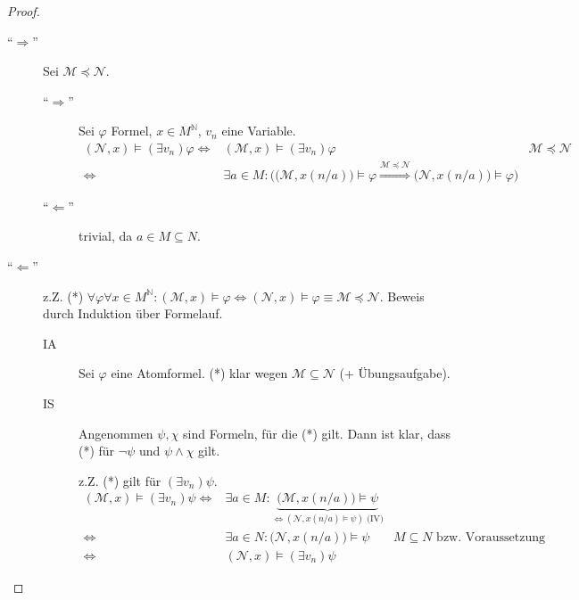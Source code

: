 \documentclass{article}
\theoremstyle{definition}
\theoremstyle{plain}
\newcommand{\m}[1]{\mathcal{#1}}
\begin{document}
    \begin{proof}
        ~\par
        \begin{description}
            \item[``$ \Rightarrow $''] Sei $ \m{M} \preceq \m{N} $.
            \begin{description}
                \item[``$ \Rightarrow $'']
                Sei $ \varphi $ Formel, $ x \in M^\mathbb{N} $, $ v_n $ eine Variable.
                \begin{align*}
                    (\m{N}, x) \models (\exists v_n) \varphi \Leftrightarrow & (\m{M}, x) \models (\exists v_n) \varphi & \m{M} \preceq \m{N} \\
                    \Leftrightarrow & \exists a \in M: \bigg( \big(\m{M}, x(n/a)\big) \models \varphi \stackrel{\m{M} \preceq \m{N}}{\Rightarrow} \big(\m{N}, x(n/a)\big) \models \varphi \bigg)
                \end{align*}
                \item[``$ \Leftarrow $''] trivial, da $ a \in M \subseteq N $.
            \end{description}
            \item[``$ \Leftarrow $''] z.Z. (*) $ \forall \varphi \forall x \in M^\mathbb{N}: (\m{M}, x) \models \varphi \Leftrightarrow (\m{N}, x) \models \varphi \equiv \m{M} \preceq \m{N} $.
            Beweis durch Induktion über Formelauf.

            \begin{description}
                \item[IA] Sei $ \varphi $ eine Atomformel. (*) klar wegen $ \m{M} \subseteq \m{N} $ (+ Übungsaufgabe).

                \item[IS] Angenommen $ \psi, \chi $ sind Formeln, für die (*) gilt.
                Dann ist klar, dass (*) für $ \neg \psi $ und $ \psi \land \chi $ gilt.

                z.Z. (*) gilt für $ (\exists v_n) \psi $.
                \begin{align*}
                    (\m{M}, x) \models (\exists v_n) \psi \Leftrightarrow & \exists a \in M: \underbrace{\big(\m{M}, x(n/a)\big) \models \psi}_{\Leftrightarrow (\m{N}, x(n/a) \models \psi) \text{ (IV)}} \\
                    \Leftrightarrow & \exists a \in N: \big(\m{N}, x(n/a)\big) \models \psi & M \subseteq N \text{ bzw. Voraussetzung} \\
                    \Leftrightarrow & (\m{N}, x) \models (\exists v_n) \psi
                \end{align*}
            \end{description}
        \end{description}
    \end{proof}
\end{document}
